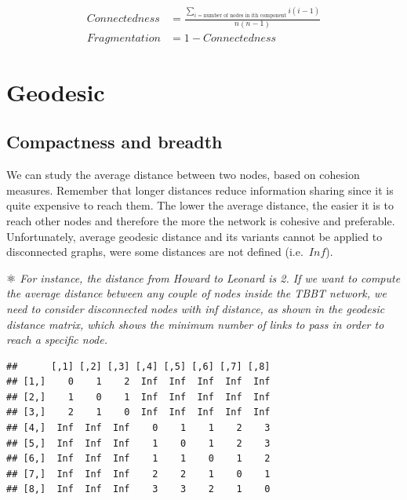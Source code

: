 \documentclass[
  notitlepage,
  onecolumn,
  openany]{book}
\newenvironment{Shaded}{\begin{snugshade}}{\end{snugshade}}
\newcommand{\FunctionTok}[1]{\textcolor[rgb]{0.00,0.00,0.00}{#1}}
\newcommand{\NormalTok}[1]{#1}
\newcommand{\SpecialCharTok}[1]{\textcolor[rgb]{0.00,0.00,0.00}{#1}}
\begin{document}
\[
\begin{aligned}
Connectedness &= \frac{\sum_{i = \text{number of nodes in ith component}} i(i-1)}{n(n-1)} \\
Fragmentation &= 1- Connectedness
\end{aligned}
\]

\hypertarget{geodesic}{%
\section{Geodesic}\label{geodesic}}

\hypertarget{compactness-and-breadth}{%
\subsection{Compactness and breadth}\label{compactness-and-breadth}}

We can study the average distance between two nodes, based on cohesion measures. Remember that longer distances reduce information sharing since it is quite expensive to reach them. The lower the average distance, the easier it is to reach other nodes and therefore the more the network is cohesive and preferable. Unfortunately, average geodesic distance and its variants cannot be applied to disconnected graphs, were some distances are not defined (i.e.~\(Inf\)).

⚛️ \emph{For instance, the distance from Howard to Leonard is 2. If we want to compute the average distance between any couple of nodes inside the TBBT network, we need to consider disconnected nodes with inf distance, as shown in the geodesic distance matrix, which shows the minimum number of links to pass in order to reach a specific node.}

\begin{Shaded}
\end{Shaded}

\begin{verbatim}
##      [,1] [,2] [,3] [,4] [,5] [,6] [,7] [,8]
## [1,]    0    1    2  Inf  Inf  Inf  Inf  Inf
## [2,]    1    0    1  Inf  Inf  Inf  Inf  Inf
## [3,]    2    1    0  Inf  Inf  Inf  Inf  Inf
## [4,]  Inf  Inf  Inf    0    1    1    2    3
## [5,]  Inf  Inf  Inf    1    0    1    2    3
## [6,]  Inf  Inf  Inf    1    1    0    1    2
## [7,]  Inf  Inf  Inf    2    2    1    0    1
## [8,]  Inf  Inf  Inf    3    3    2    1    0
\end{verbatim}
\end{document}
